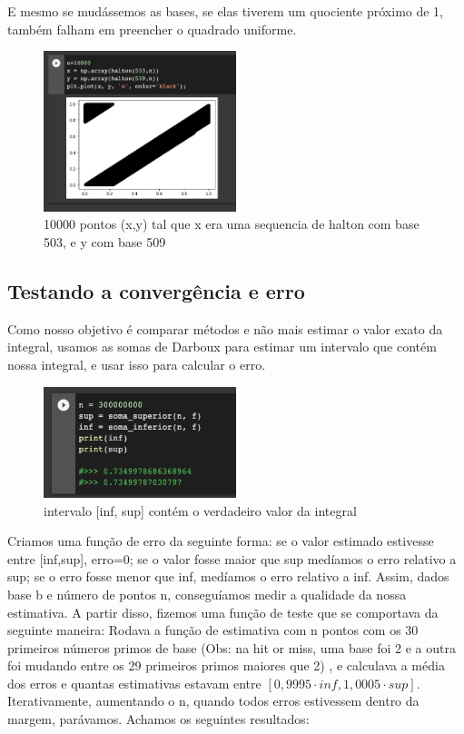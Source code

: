 \documentclass{article}
\begin{document}
E mesmo se mudássemos as bases, se elas tiverem um quociente próximo de 1, também falham em preencher o quadrado uniforme.

\begin{figure}[ht]
\centering
\includegraphics[width=0.5\textwidth]{falha3.png}
\caption{\label{fig:falha4} 10000 pontos (x,y) tal que x era uma sequencia de halton com base 503, e y com base 509  }
\end{figure}


\subsection{Testando a convergência e erro}
Como nosso objetivo é comparar métodos e não mais estimar o valor exato da integral, usamos as somas de Darboux para estimar um intervalo que contém nossa integral, e usar isso para calcular o erro.

\begin{figure}[ht]
\centering
\includegraphics[width=0.5\textwidth]{inf_sup.png}
\caption{\label{fig:infsup} intervalo [inf, sup] contém o verdadeiro valor da integral  }
\end{figure}

Criamos uma função de erro da seguinte forma:
se o valor estimado estivesse entre [inf,sup], erro=0; se o valor fosse maior que sup medíamos o erro relativo a sup; se o erro fosse menor que inf, medíamos o erro relativo a inf. Assim, dados base b e número de pontos n, conseguíamos medir a qualidade da nossa estimativa. A partir disso, fizemos uma função de teste que se comportava da seguinte maneira: Rodava a função de estimativa com n pontos com os 30 primeiros números primos de base (Obs: na hit or miss, uma base foi 2 e a outra foi mudando entre os 29 primeiros primos maiores que 2) , e calculava a média dos erros e quantas estimativas estavam entre $[0,9995 \cdot inf , 1,0005 \cdot sup]$. Iterativamente, aumentando o n, quando todos erros estivessem dentro da margem, parávamos.
Achamos os seguintes resultados:
\end{document}
